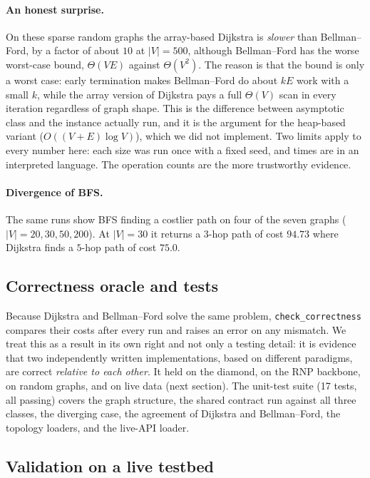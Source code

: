 \documentclass[11pt,a4paper]{article}
\begin{document}
\paragraph{An honest surprise.}
On these sparse random graphs the array-based Dijkstra is \emph{slower} than Bellman--Ford, by a factor of about $10$
at $|V|=500$, although Bellman--Ford has the worse worst-case bound, $\Theta(VE)$ against $\Theta(V^2)$. The reason is
that the bound is only a worst case: early termination makes Bellman--Ford do about $kE$ work with a small $k$, while
the array version of Dijkstra pays a full $\Theta(V)$ scan in every iteration regardless of graph shape. This is the
difference between asymptotic class and the instance actually run, and it is the argument for the heap-based
variant ($O((V+E)\log V)$), which we did not implement. Two limits apply to every number here: each size was run once
with a fixed seed, and times are in an interpreted language. The operation counts are the more trustworthy evidence.

\paragraph{Divergence of BFS.}
The same runs show BFS finding a costlier path on four of the seven graphs ($|V|=20,30,50,200$). At $|V|=30$ it
returns a $3$-hop path of cost $94.73$ where Dijkstra finds a $5$-hop path of cost $75.0$.

\subsection{Correctness oracle and tests}
\label{sec:oracle}

Because Dijkstra and Bellman--Ford solve the same problem, \texttt{check\_correctness} compares their costs after every
run and raises an error on any mismatch. We treat this as a result in its own right and not only a testing detail:
it is evidence that two independently written implementations, based on different paradigms, are correct
\emph{relative to each other}. It held on the diamond, on the RNP backbone, on random graphs, and on live data
(next section). The unit-test suite (17 tests, all passing) covers the graph structure, the shared contract run
against all three classes, the diverging case, the agreement of Dijkstra and Bellman--Ford, the topology loaders,
and the live-API loader.

\subsection{Validation on a live testbed}
\label{sec:live}
\end{document}
